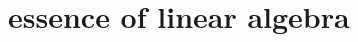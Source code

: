 \documentclass[../main.tex]{subfiles}
\begin{document}
\chapter{essence of linear algebra}
\end{document}
